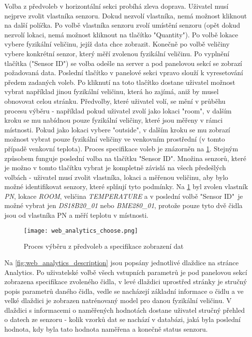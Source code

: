 Volba z předvoleb v horizontální sekci probíhá zleva doprava. Uživatel musí nejprve zvolit vlastníka senzoru. Dokud nezvolí vlastníka, nemá možnost kliknout na další políčka. Po volbě vlastníka senzoru zvolí umístění senzoru (opět dokud nezvolí lokaci, nemá možnost kliknout na tlačítko "Quantity"). Po volbě lokace vybere fyzikální veličinu, jejíž data chce zobrazit. Konečně po volbě veličiny vybere konkrétní senzor, který měří zvolenou fyzikální veličinu. Po vyplnění tlačítka ("Sensor ID") se volba odešle na server a pod panelovou sekcí se zobrazí požadovaná data. Poslední tlačítko v panelové sekci vpravo slouží k vyresetování předem zadaných voleb. Po kliknutí na toto tlačítko dostane uživatel možnost vybrat například jinou fyzikální veličinu, která ho zajímá, aniž by musel obnovovat celou stránku. Předvolby, které uživatel volí, se mění v průběhu procesu výběru - například pokud uživatel zvolí jako lokaci "room", v dalším kroku se mu nabídnou pouze fyzikální veličiny, které jsou měřeny v rámci místnosti. Pokud jako lokaci vybere "outside", v dalším kroku se mu zobrazí možnost vybrat pouze fyzikální veličiny ve venkovním prostřední (v tomto případě venkovní teplota). Proces specifikace voleb je znázorněn na \cref{fig:web_analytics_choose}. Stejným způsobem funguje poslední volba na tlačítku "Sensor ID". Množina senzorů, které je možno v tomto tlačítku vybrat je kompletně závislá na všech předešlých volbách - uživatel musí zvolit vlastníka, lokaci a měřenou veličinu, aby bylo možné identifikovat senzory, které splňují tyto podmínky. Na \cref{fig:web_analytics_choose} byl zvolen vlastník \textit{PN}, lokace \textit{ROOM}, veličina \textit{TEMPERATURE} a v poslední volbě "Sensor ID"\ je možné vybrat jen \textit{DS18B20\_01} nebo \textit{BME280\_01}, protože pouze tyto dvě čidla jsou od vlastníka PN a měří teplotu v místnosti.

\begin{figure}[H]
  \centering
  \texttt{[image: web\_analytics\_choose.png]}
  \caption{Proces výběru z předvoleb a specifikace zobrazení dat}
  \label{fig:web_analytics_choose}
\end{figure}

Na \cref{fig:web_analytics_description} jsou popsány jednotlivé dlaždice na stránce Analytics. Po uživatelské volbě všech vstupních parametrů je pod panelovou sekcí zobrazena specifikace zvoleného čidla, v levé dlaždici uprostřed stránky je stručný popis parametrů daného čidla, vedle se nacházejí základní informace o čidlu a ve velké dlaždici je zobrazen natrénovaný model pro danou fyzikální veličinu. V dlaždici s informacemi o naměřených hodnotách dostane uživatel stručný přehled o datech ze senzoru - kolik vzorků dat se nachází v databázi, jaká byla poslední hodnota, kdy byla tato hodnota naměřena a konečně status senzoru.

